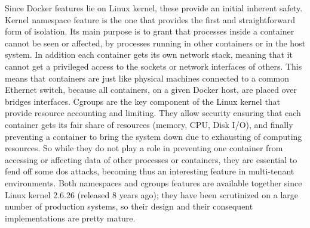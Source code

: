 Since Docker features lie on Linux kernel, these provide an initial inherent safety. Kernel namespace
feature is the one that provides the first and straightforward form of isolation. Its main purpose is
to grant that processes inside a container cannot be seen or affected, by processes running
in other containers or in the host system. In addition each container gets its own network stack, meaning
that it cannot get a privileged access to the sockets or network interfaces of others. This means that
containers are just like physical machines connected to a common Ethernet switch, because all containers, on
a given Docker host, are placed over bridges interfaces. Cgroups are the key component of the Linux kernel
that provide resource accounting and limiting. They allow security ensuring that each container gets its fair
share of resources (memory, CPU, Disk I/O), and finally preventing a container to bring the system down due to
exhausting of computing resources. So while they do not play a role in preventing one container from accessing or
affecting data of other processes or containers, they are essential to fend off some \ac{dos} attacks, becoming
thus an interesting feature in multi-tenant environments. Both namespaces and cgroups features are available
together since Linux kernel 2.6.26 (released 8 years ago); they have been scrutinized on a large number of
production systems, so their design and their consequent implementations are pretty mature.


